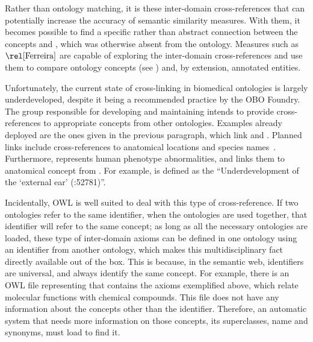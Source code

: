 Rather than ontology matching, it is these inter-domain cross-references that can potentially increase the accuracy of semantic similarity measures. With them, it becomes possible to find a specific rather than abstract connection between the  concepts  and , which was otherwise absent from the  ontology. Measures such as~$\ferreira$ are capable of exploring the inter-domain cross-references and use them to compare ontology concepts (see ) and, by extension, annotated entities.


Unfortunately, the current state of cross-linking in biomedical ontologies is largely underdeveloped, despite it being a recommended practice by the OBO Foundry. The group responsible for developing and maintaining  intends to provide cross-references to appropriate concepts from other ontologies. Examples already deployed are the ones given in the previous paragraph, which link  and . Planned links include cross-references to anatomical locations and species names~\citep{Mungall2011}. Furthermore,  represents human phenotype abnormalities, and links them to anatomical concept from . For example,  is defined as the ``Underdevelopment of the `external ear' (:52781)''.

Incidentally, OWL is well suited to deal with this type of cross-reference. If two ontologies refer to the same identifier, when the ontologies are used together, that identifier will refer to the same concept; as long as all the necessary ontologies are loaded, these type of inter-domain axioms can be defined in one ontology using an identifier from another ontology, which makes this multidisciplinary fact directly available out of the box. This is because, in the semantic web, identifiers are universal, and always identify the same concept. For example, there is an OWL file representing  that contains the axioms exemplified above, which relate molecular functions with chemical compounds. This file does not have any information about the  concepts other than the identifier. Therefore, an automatic system that needs more information on those  concepts, \eg its superclasses, name and synonyms, must load  to find it.


